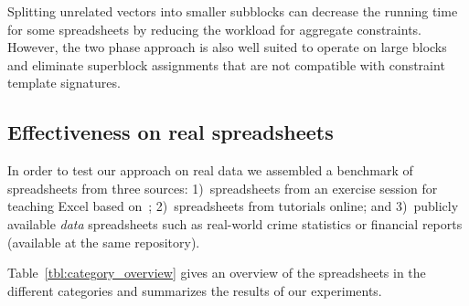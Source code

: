 Splitting unrelated vectors into smaller subblocks can decrease the running time for some spreadsheets by reducing the workload for aggregate constraints.
However, the two phase approach is also well suited to operate on large blocks and eliminate superblock assignments that are not compatible with constraint template signatures. 




\subsection{Effectiveness on real spreadsheets}
In order to test our approach on real data we assembled a benchmark of spreadsheets from three sources:
1)~spreadsheets from an exercise session for teaching Excel based on~\cite{excel_book}; 2)~spreadsheets from tutorials online; and 3)~publicly available \textit{data} spreadsheets such as real-world crime statistics or financial reports (available at the same repository).

Table~\ref{tbl:category_overview} gives an overview of the spreadsheets in the different categories and summarizes the results of our experiments.

